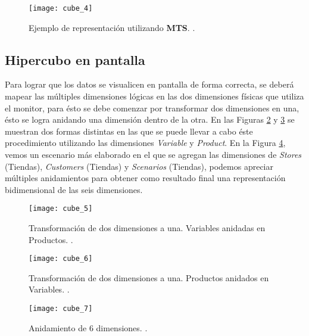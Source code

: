 \documentclass[a4paper,11pt]{article}
\begin{document}
    \begin{figure}
      \begin{center}
        \texttt{[image: cube\_4]}
        \caption{Ejemplo de representación utilizando \textbf{MTS}. \cite[p.~55]{olap_solutions}.}
        \label{cube_4}
      \end{center}
    \end{figure}
    
    
    \subsection{Hipercubo en pantalla}
    
    Para lograr que los datos se visualicen en pantalla de forma correcta, se deberá mapear las múltiples dimensiones lógicas en las dos dimensiones físicas
    que utiliza el monitor, para ésto se debe comenzar por transformar dos dimensiones en una, ésto se logra anidando una dimensión dentro de la otra. En las
    Figuras \ref{cube_5} y \ref{cube_6} se muestran dos formas distintas en las que se puede llevar a cabo éste procedimiento utilizando las dimensiones
    \textit{Variable} y \textit{Product}. En la Figura \ref{cube_7}, vemos un escenario más elaborado en el que se agregan las dimensiones de
    \textit{Stores} (Tiendas), \textit{Customers} (Tiendas) y \textit{Scenarios} (Tiendas), podemos apreciar múltiples anidamientos para 
    obtener como resultado final una representación bidimensional de las seis dimensiones.
    
    \begin{figure}
      \begin{center}
        \texttt{[image: cube\_5]}
        \caption{Transformación de dos dimensiones a una. Variables anidadas en Productos. \cite[p.~58]{olap_solutions}.}
        \label{cube_5}
      \end{center}
    \end{figure}
    
    \begin{figure}
      \begin{center}
        \texttt{[image: cube\_6]}
        \caption{Transformación de dos dimensiones a una. Productos anidados en Variables. \cite[p.~58]{olap_solutions}.}
        \label{cube_6}
      \end{center}
    \end{figure}
    
    \begin{figure}
      \begin{center}
        \texttt{[image: cube\_7]}
        \caption{Anidamiento de 6 dimensiones. \cite[p.~60]{olap_solutions}.}
        \label{cube_7}
      \end{center}
    \end{figure}
    
\end{document}
